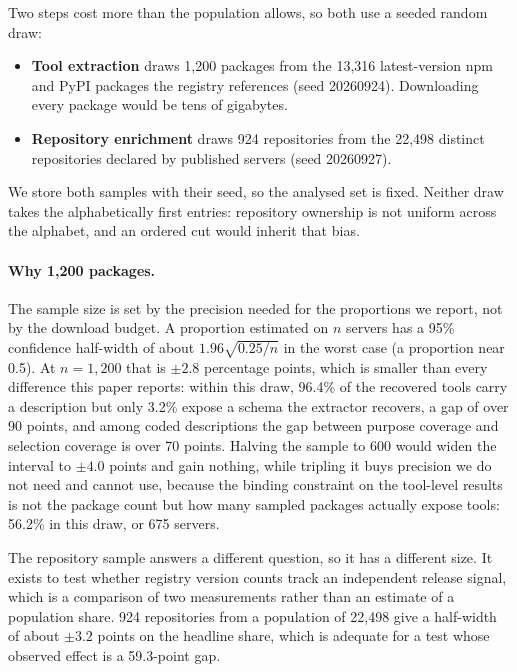 \documentclass[a4paper,fleqn]{cas-dc}
\begin{document}
Two steps cost more than the population allows, so both use a seeded random
draw:

\begin{itemize}
\item \textbf{Tool extraction} draws 1,200 packages from the 13,316
latest-version npm and PyPI packages the registry references (seed
20260924). Downloading every package would be tens of gigabytes.
\item \textbf{Repository enrichment} draws 924 repositories from the 22,498
distinct repositories declared by published servers (seed 20260927).
\end{itemize}

We store both samples with their seed, so the analysed set is fixed. Neither
draw takes the alphabetically first entries: repository ownership is not
uniform across the alphabet, and an ordered cut would inherit that bias.

\paragraph{Why 1,200 packages.} The sample size is set by the precision needed
for the proportions we report, not by the download budget. A proportion
estimated on $n$ servers has a 95\% confidence half-width of about
$1.96\sqrt{0.25/n}$ in the worst case (a proportion near 0.5). At $n = 1{,}200$
that is $\pm 2.8$ percentage points, which is smaller than every difference this
paper reports: within this draw, 96.4\% of the recovered tools carry a
description but only 3.2\% expose a schema the extractor recovers, a gap of over
90 points, and among coded descriptions the gap between purpose coverage and
selection coverage is over 70 points. Halving the sample
to 600 would widen the interval to $\pm 4.0$ points and gain nothing, while
tripling it buys precision we do not need and cannot use, because the binding
constraint on the tool-level results is not the package count but how many
sampled packages actually expose tools: 56.2\% in this draw, or 675 servers.

The repository sample answers a different question, so it has a different size.
It exists to test whether registry version counts track an independent release
signal, which is a comparison of two measurements rather than an estimate of a
population share. 924 repositories from a population of 22,498 give a
half-width of about $\pm 3.2$ points on the headline share, which is adequate
for a test whose observed effect is a 59.3-point gap.
\end{document}
